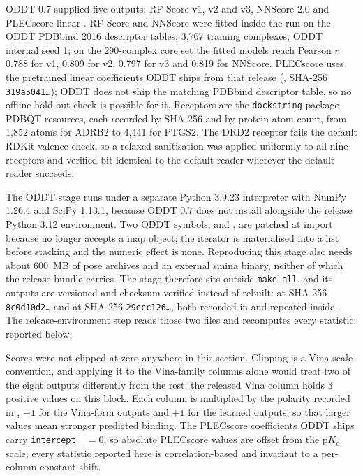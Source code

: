 ODDT 0.7 supplied five outputs: RF-Score v1, v2 and v3, NNScore 2.0 and PLECscore linear
\cite{oddt2015,rfscore2010,ballester2014rfscore,nnscore2011,plecscore2019}. RF-Score and
NNScore were fitted inside the run on the ODDT PDBbind 2016 descriptor tables, 3{,}767
training complexes, ODDT internal seed 1; on the 290-complex core set the fitted models reach
Pearson $r$ 0.788 for v1, 0.809 for v2, 0.797 for v3 and 0.819 for NNScore. PLECscore uses
the pretrained linear coefficients ODDT ships from that release
(, SHA-256
\texttt{319a5041\ldots}); ODDT does not ship the matching PDBbind descriptor table, so no
offline hold-out check is possible for it. Receptors are the \texttt{dockstring} package
PDBQT resources, each recorded by SHA-256 and by protein atom count, from 1{,}852 atoms for
ADRB2 to 4{,}441 for PTGS2. The DRD2 receptor fails the default RDKit valence check, so a
relaxed sanitisation was applied uniformly to all nine receptors and verified bit-identical
to the default reader wherever the default reader succeeds.

The ODDT stage runs under a separate Python 3.9.23 interpreter with NumPy 1.26.4 and SciPy
1.13.1, because ODDT 0.7 does not install alongside the release Python 3.12 environment. Two
ODDT symbols,  and
, are patched at import because
 no longer accepts a map object; the iterator is materialised into
a list before stacking and the numeric effect is none. Reproducing this stage also needs about
600~MB of pose archives and an external smina binary, neither of which the release bundle
carries. The stage therefore sits outside \texttt{make all}, and its outputs are versioned and
checksum-verified instead of rebuilt:  at SHA-256
\texttt{8c0d10d2\ldots} and  at SHA-256
\texttt{29ecc126\ldots}, both recorded in  and repeated inside
. The release-environment step reads those two files and recomputes every
statistic reported below.

Scores were not clipped at zero anywhere in this section. Clipping is a Vina-scale convention,
and applying it to the Vina-family columns alone would treat two of the eight outputs
differently from the rest; the released Vina column holds 3 positive values on this block. Each
column is multiplied by the polarity recorded in , $-1$ for
the Vina-form outputs and $+1$ for the learned outputs, so that larger values mean stronger
predicted binding. The PLECscore coefficients ODDT ships carry \texttt{intercept\_}~$=0$, so
absolute PLECscore values are offset from the $\mathrm{p}K_\mathrm{d}$ scale; every statistic
reported here is correlation-based and invariant to a per-column constant shift.

